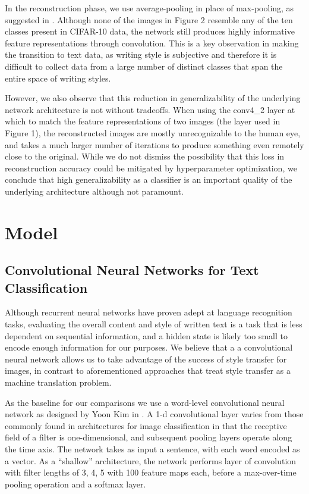 \documentclass{vldb}
\begin{document}
In the reconstruction phase, we use average-pooling in place of max-pooling, as suggested in \cite{GatysEB15a}. Although none of the images in Figure 2 resemble any of the ten classes present in CIFAR-10 data, the network still produces highly informative feature representations through convolution. This is a key observation in making the transition to text data, as writing style is subjective and therefore it is difficult to collect data from a large number of distinct classes that span the entire space of writing styles. 

However, we also observe that this reduction in generalizability of the underlying network architecture is not without tradeoffs. When using the conv4\_2 layer at which to match the feature representations of two images (the layer used in Figure 1), the reconstructed images are mostly unrecognizable to the human eye, and takes a much larger number of iterations to produce something even remotely close to the original. While we do not dismiss the possibility that this loss in reconstruction accuracy could be mitigated by hyperparameter optimization, we conclude that high generalizability as a classifier is an important quality of the underlying architecture although not paramount.

\section{Model}
\subsection{Convolutional Neural Networks for Text Classification}
Although recurrent neural networks have proven adept at language recognition tasks, evaluating the overall content and style of written text is a task that is less dependent on sequential information, and a hidden state is likely too small to encode enough information for our purposes. We believe that a a convolutional neural network allows us to take advantage of the success of style transfer for images, in contrast to aforementioned approaches that treat style transfer as a machine translation problem.

As the baseline for our comparisons we use a word-level convolutional neural network as designed by Yoon Kim in \cite{Kim14f}. A 1-d convolutional layer varies from those commonly found in architectures for image classification in that the receptive field of a filter is one-dimensional, and subsequent pooling layers operate along the time axis. The network takes as input a sentence, with each word encoded as a vector. As a ``shallow'' architecture, the network performs layer of convolution with filter lengths of 3, 4, 5 with 100 feature maps each, before a max-over-time pooling operation and a softmax layer. 
\end{document}
